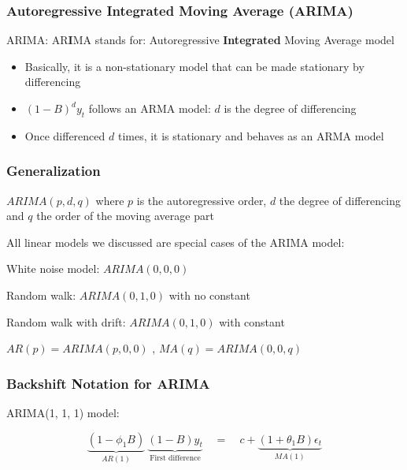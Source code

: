 \documentclass{beamer}
\newenvironment{wideitemize}{\itemize\addtolength{\itemsep}{10pt}}{\enditemize}
\begin{document}
\begin{frame}
  \frametitle{Autoregressive Integrated Moving Average (ARIMA)}

  ARIMA: AR\textbf{I}MA stands for: Autoregressive \textbf{Integrated} Moving Average model

  \begin{itemize}
  \item Basically, it is a non-stationary model that can be made stationary by differencing
  \item $(1-B)^d y_t$ follows an ARMA model: $d$ is the degree of differencing
  \item Once differenced $d$ times, it is stationary and behaves as an ARMA model
  \end{itemize}  
\end{frame}


\begin{frame}
  \frametitle{Generalization}

  \begin{wideitemize}
  \item $ARIMA(p, d, q)$ where $p$ is the autoregressive order, $d$ the degree of differencing and $q$ the order of the moving average part
  \item All linear models we discussed are special cases of the ARIMA model:
    \begin{wideitemize}
    \item White noise model: $ARIMA(0, 0, 0)$
    \item Random walk: $ARIMA(0, 1, 0)$ with no constant
    \item Random walk with drift: $ARIMA(0, 1, 0)$ with constant  
    \item $AR(p) = ARIMA(p, 0, 0)$ , $MA(q) = ARIMA(0, 0, q)$
    \end{wideitemize}
  \end{wideitemize}
    
\end{frame}



\begin{frame}
  \frametitle{Backshift Notation for ARIMA}
  ARIMA(1, 1, 1) model:

  \begin{equation*}
    \underbrace{(1-\phi_1B)}_{AR(1)} \ \underbrace{(1-B)y_t}_{\text{First difference}} \quad = \quad c + \underbrace{(1+\theta_1B)\epsilon_t}_{MA(1)}
  \end{equation*}  
\end{frame}
\end{document}
